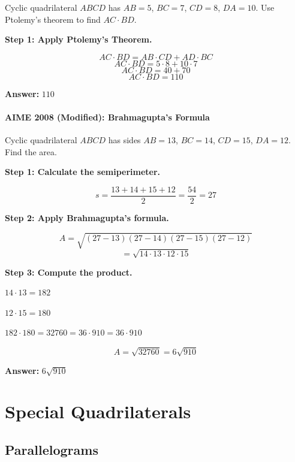 ﻿\documentclass[12pt]{extarticle}
\begin{document}
Cyclic quadrilateral $ABCD$ has $AB = 5$, $BC = 7$, $CD = 8$, $DA = 10$. Use Ptolemy's theorem to find $AC \cdot BD$.

\begin{solutionbox}
\textbf{Step 1: Apply Ptolemy's Theorem.}

\[AC \cdot BD = AB \cdot CD + AD \cdot BC\]
\[AC \cdot BD = 5 \cdot 8 + 10 \cdot 7\]
\[AC \cdot BD = 40 + 70\]
\[AC \cdot BD = 110\]

\textbf{Answer:} $\boxed{110}$
\end{solutionbox}

\paragraph{AIME 2008 (Modified): Brahmagupta's Formula}

Cyclic quadrilateral $ABCD$ has sides $AB = 13$, $BC = 14$, $CD = 15$, $DA = 12$. Find the area.

\begin{solutionbox}
\textbf{Step 1: Calculate the semiperimeter.}

\[s = \frac{13 + 14 + 15 + 12}{2} = \frac{54}{2} = 27\]

\textbf{Step 2: Apply Brahmagupta's formula.}

\[A = \sqrt{(27-13)(27-14)(27-15)(27-12)}\]
\[= \sqrt{14 \cdot 13 \cdot 12 \cdot 15}\]

\textbf{Step 3: Compute the product.}

$14 \cdot 13 = 182$

$12 \cdot 15 = 180$

$182 \cdot 180 = 32760 = 36 \cdot 910 = 36 \cdot 910$

\[A = \sqrt{32760} = 6\sqrt{910}\]

\textbf{Answer:} $\boxed{6\sqrt{910}}$
\end{solutionbox}

\section{Special Quadrilaterals}

\subsection{Parallelograms}
\end{document}
